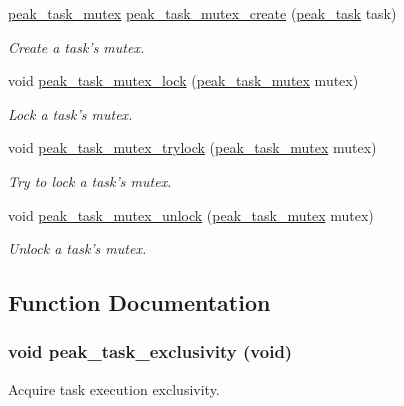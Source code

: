 \begin{CompactItemize}
\hyperlink{group__task__sync_ga1}{peak\_\-task\_\-mutex} \hyperlink{group__task__sync_ga8}{peak\_\-task\_\-mutex\_\-create} (\hyperlink{group__task__common_ga0}{peak\_\-task} task)
\begin{CompactList}\small\item\em Create a task's mutex. \item\end{CompactList}\item 
void \hyperlink{group__task__sync_ga9}{peak\_\-task\_\-mutex\_\-lock} (\hyperlink{group__task__sync_ga1}{peak\_\-task\_\-mutex} mutex)
\begin{CompactList}\small\item\em Lock a task's mutex. \item\end{CompactList}\item 
void \hyperlink{group__task__sync_ga10}{peak\_\-task\_\-mutex\_\-trylock} (\hyperlink{group__task__sync_ga1}{peak\_\-task\_\-mutex} mutex)
\begin{CompactList}\small\item\em Try to lock a task's mutex. \item\end{CompactList}\item 
void \hyperlink{group__task__sync_ga11}{peak\_\-task\_\-mutex\_\-unlock} (\hyperlink{group__task__sync_ga1}{peak\_\-task\_\-mutex} mutex)
\begin{CompactList}\small\item\em Unlock a task's mutex. \item\end{CompactList}\end{CompactItemize}


\subsection{Function Documentation}
\hypertarget{group__task__sync_ga2}{
\subsubsection[peak\_\-task\_\-exclusivity]{\setlength{\rightskip}{0pt plus 5cm}void peak\_\-task\_\-exclusivity (void)}}
\label{group__task__sync_ga2}


Acquire task execution exclusivity. 

